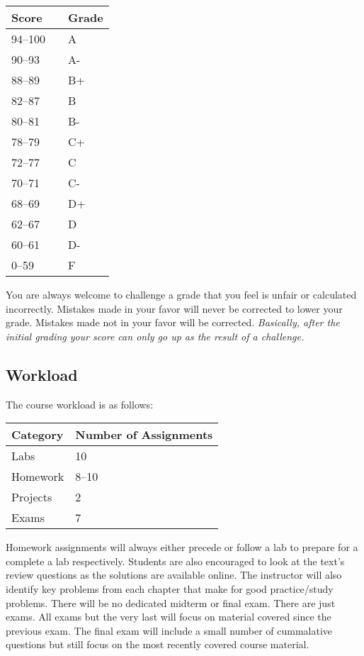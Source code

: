 \documentclass[10pt]{article}
\begin{document}
\begin{center}
\begin{small}
\begin{tabular}{lcl}
Score & & Grade \\ \toprule
94--100 & & A \\
90--93 & & A- \\
88--89 & & B+ \\
82--87 & & B \\
80--81 & & B- \\
78--79 & & C+ \\
72--77 & & C \\
70--71 & & C- \\
68--69 & & D+ \\
62--67 & & D \\
60--61 & & D- \\
0--59 & & F
\end{tabular}
\end{small}
\end{center}


You are always welcome to challenge a grade that you feel is unfair or calculated incorrectly.  Mistakes made in your favor will never be corrected to lower your grade.  Mistakes made not in your favor will be corrected.  \textit{Basically, after the initial grading your score can only go up as the result of a challenge.}

\subsection{Workload}

The course workload is as follows:
\begin{center}
  \begin{tabular}{ll}
    Category & Number of Assignments \\ \toprule
    Labs & 10 \\
    Homework & 8--10 \\
    Projects & 2 \\
    Exams & 7
  \end{tabular}
\end{center}

Homework assignments will always either precede or follow a lab to prepare for a complete a lab respectively. Students are also encouraged to look at the text's review questions as the solutions are available online.  The instructor will also identify key problems from each chapter that make for good practice/study problems. There will be no dedicated midterm or final exam. There are just exams.  All exams but the very last will focus on material covered since the previous exam. The final exam will include a small number of cummalative questions but still focus on the most recently covered course material.
\end{document}

